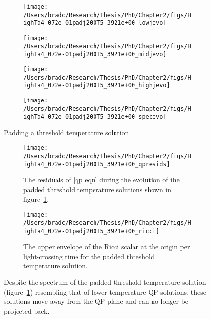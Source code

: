\documentclass[../PhD.tex]{subfiles}
\begin{document}
\begin{figure}[h]
	\centering
	\begin{subfigure}[t]{0.45\textwidth}
		\texttt{[image: /Users/bradc/Research/Thesis/PhD/Chapter2/figs/HighTa4\_072e-01padj200T5\_3921e+00\_lowjevo]}
	\end{subfigure}
	\;
	\begin{subfigure}[t]{0.45\textwidth}
		\texttt{[image: /Users/bradc/Research/Thesis/PhD/Chapter2/figs/HighTa4\_072e-01padj200T5\_3921e+00\_midjevo]}
	\end{subfigure}
	\;
	\begin{subfigure}[t]{0.45\textwidth}
		\texttt{[image: /Users/bradc/Research/Thesis/PhD/Chapter2/figs/HighTa4\_072e-01padj200T5\_3921e+00\_highjevo]}
	\end{subfigure}
	\;
	\begin{subfigure}[t]{0.45\textwidth}
		\texttt{[image: /Users/bradc/Research/Thesis/PhD/Chapter2/figs/HighTa4\_072e-01padj200T5\_3921e+00\_specevo]}
	\end{subfigure}
	\caption{Padding a threshold temperature solution}
	\label{fig:HighTa4_072e-01padj200T5_3921e+00_evo}
\end{figure}

\begin{figure}[ht]
	\centering
	\begin{subfigure}[t]{0.45\textwidth}
		\texttt{[image: /Users/bradc/Research/Thesis/PhD/Chapter2/figs/HighTa4\_072e-01padj200T5\_3921e+00\_qpresids]}
		\caption{The residuals of \eqref{qp eqn} during the evolution of the padded threshold temperature solutions shown in figure~\ref{fig:HighTa4_072e-01padj200T5_3921e+00_evo}.}
	\end{subfigure}
	\;
	\begin{subfigure}[t]{0.45\textwidth}
		\texttt{[image: /Users/bradc/Research/Thesis/PhD/Chapter2/figs/HighTa4\_072e-01padj200T5\_3921e+00\_ricci]}
		\caption{The upper envelope of the Ricci scalar at the origin per light-crossing time for the padded threshold temperature solution.}
	\end{subfigure}
	\caption{Despite the spectrum of the padded threshold temperature solution (figure~\ref{fig:HighTa4_072e-01padj200T5_3921e+00_evo}) resembling that of lower-temperature QP solutions, these solutions move away from the QP plane and can no longer be projected back.}
	\label{fig: HighTa4_072e-01padj200T5_3921e+00_projections}
\end{figure}
\end{document}
